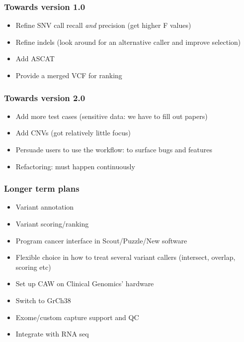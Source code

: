 \documentclass{beamer}
\begin{document}
\begin{frame}
\frametitle{Towards version 1.0}
    \begin{itemize}
        \item Refine SNV call recall {\it and} precision (get higher F values)
        \item Refine indels (look around for an alternative caller and improve selection)
        \item Add ASCAT 
        \item Provide a merged VCF for ranking
    \end{itemize}
\end{frame}

\begin{frame}
\frametitle{Towards version 2.0}
    \begin{itemize}
        \item Add more test cases (sensitive data: we have to fill out papers)
        \item Add CNVs (got relatively little focus)
        \item Persuade users to use the workflow: to surface bugs and features 
        \item Refactoring: must happen continuously
    \end{itemize} 
\end{frame}

\begin{frame}
\frametitle{Longer term plans}
    \begin{itemize}
        \item Variant annotation
        \item Variant scoring/ranking
        \item Program cancer interface in Scout/Puzzle/New software
        \item Flexible choice in how to treat several variant callers (intersect, overlap, scoring etc)
        \item Set up CAW on Clinical Genomics’ hardware
        \item Switch to GrCh38
        \item Exome/custom capture support and QC
        \item Integrate with RNA seq 
    \end{itemize} 
\end{frame}
\end{document}
